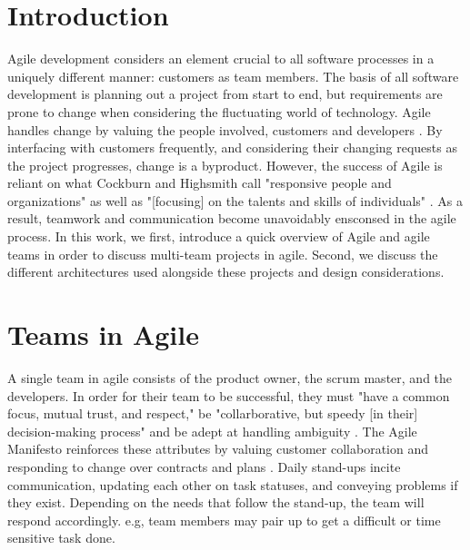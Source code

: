 \documentclass[sigplan,screen]{acmart}
\begin{document}

%

%
\maketitle

\section{Introduction}
Agile development considers an element crucial to all software processes in a uniquely different manner: customers as team members. The basis of all software development is planning out a project from start to end, but requirements are prone to change when considering the fluctuating world of technology. Agile handles change by valuing the people involved, customers and developers \cite{Highsmith01}. By interfacing with customers frequently, and considering their changing requests as the project progresses, change is a byproduct. However, the success of Agile is reliant on what Cockburn and Highsmith call "responsive people and organizations" as well as "[focusing] on the talents and skills of individuals" \cite{Cockburn01}. As a result, teamwork and communication become unavoidably ensconsed in the agile process.
In this work, we first, introduce a quick overview of Agile and agile teams in order to discuss multi-team projects in agile. Second, we discuss the different architectures used alongside these projects and design considerations.

\section{Teams in Agile}
A single team in agile consists of the product owner, the scrum master, and the developers. In order for their team to be successful, they must "have a common focus, mutual trust, and respect," be "collarborative, but speedy [in their] decision-making process" and be adept at handling ambiguity \cite{Cockburn01}. The Agile Manifesto reinforces these attributes by valuing customer collaboration and responding to change over contracts and plans \cite{Beck01}. Daily stand-ups incite communication, updating each other on task statuses, and conveying problems if they exist. Depending on the needs that follow the stand-up, the team will respond accordingly. e.g, team members may pair up to get a difficult or time sensitive task done.
\end{document}
